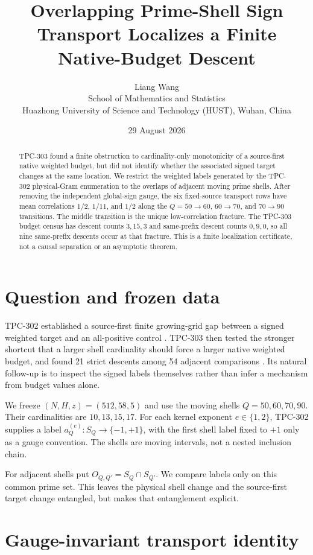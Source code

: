 \documentclass[11pt]{article}
\title{Overlapping Prime-Shell Sign Transport Localizes a Finite\\
Native-Budget Descent}
\author{Liang Wang\\
School of Mathematics and Statistics\\
Huazhong University of Science and Technology (HUST), Wuhan, China}
\date{29 August 2026}
\begin{document}
\maketitle

\begin{abstract}
TPC-303 found a finite obstruction to cardinality-only monotonicity of a
source-first native weighted budget, but did not identify whether the
associated signed target changes at the same location.  We restrict the
weighted labels generated by the TPC-302 physical-Gram enumeration to the
overlaps of adjacent moving prime shells.  After removing the independent
global-sign gauge, the six fixed-source transport rows have mean correlations
$1/2$, $1/11$, and $1/2$ along the $Q=50\to60$, $60\to70$, and $70\to90$
transitions.  The middle transition is the unique low-correlation fracture.
The TPC-303 budget census has descent counts $3,15,3$ and same-prefix descent
counts $0,9,0$, so all nine same-prefix descents occur at that fracture.  This
is a finite localization certificate, not a causal separation or an
asymptotic theorem.
\end{abstract}

\section{Question and frozen data}

TPC-302 established a source-first finite growing-grid gap between a signed
weighted target and an all-positive control \cite{tpc302}.  TPC-303 then tested
the stronger shortcut that a larger shell cardinality should force a larger
native weighted budget, and found 21 strict descents among 54 adjacent
comparisons \cite{tpc303}.  Its natural follow-up is to inspect the signed
labels themselves rather than infer a mechanism from budget values alone.

We freeze $(N,H,z)=(512,58,5)$ and use the moving shells
$Q=50,60,70,90$.  Their cardinalities are $10,13,15,17$.  For each kernel
exponent $e\in\{1,2\}$, TPC-302 supplies a label
$a_Q^{(e)}:S_Q\to\{-1,+1\}$, with the first shell label fixed to $+1$ only
as a gauge convention.  The shells are moving intervals, not a nested
inclusion chain.

For adjacent shells put $O_{Q,Q'}=S_Q\cap S_{Q'}$.  We compare labels only
on this common prime set.  This leaves the physical shell change and the
source-first target change entangled, but makes that entanglement explicit.

\section{Gauge-invariant transport identity}
\end{document}
